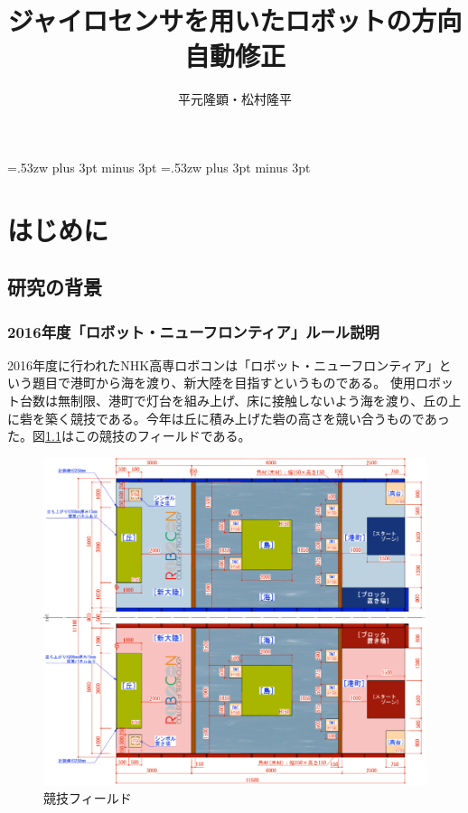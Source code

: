 \documentclass[12pt,oneside]{sotsuken_paper}
\title{ジャイロセンサを用いたロボットの方向自動修正}
\author{平元隆顕・松村隆平}
\begin{document}
\setlength{\baselineskip}{9truemm}

\kanjiskip=.53zw plus 3pt minus 3pt
\xkanjiskip=.53zw plus 3pt minus 3pt

\tableofcontents


\chapter{はじめに}

	\section{研究の背景}

		\subsection{2016年度「ロボット・ニューフロンティア」ルール説明}
		2016年度に行われたNHK高専ロボコンは「ロボット・ニューフロンティア」という題目で港町から海を渡り、新大陸を目指すというものである。
		使用ロボット台数は無制限、港町で灯台を組み上げ、床に接触しないよう海を渡り、丘の上に砦を築く競技である。今年は丘に積み上げた砦の高さを競い合うものであった。図\ref{競技フィールド}はこの競技のフィールドである。

		\begin{figure}[htp]
			\begin{center}
				\includegraphics[width=120mm]{Image/フィールド.png}
				\caption{競技フィールド}
				\label{競技フィールド}
			\end{center}
		\end{figure}
\end{document}
